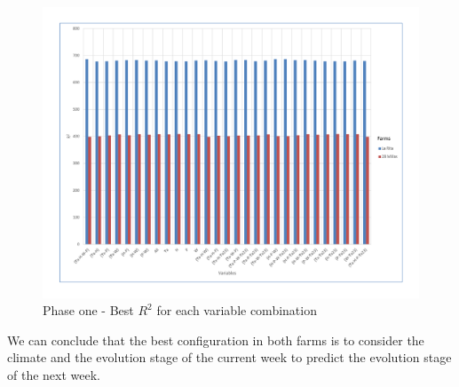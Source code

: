 \begin{figure}[H] 
 \centering
 \includegraphics[scale=.5]{2017-01-15-Variables-R2}
 \caption{Phase one - Best $R^2$ for each variable combination} 
 \label{figura7} 
\end{figure}

We can conclude that the best configuration in both farms is to consider the climate and the evolution stage of the current week to predict the evolution stage of the next week.


